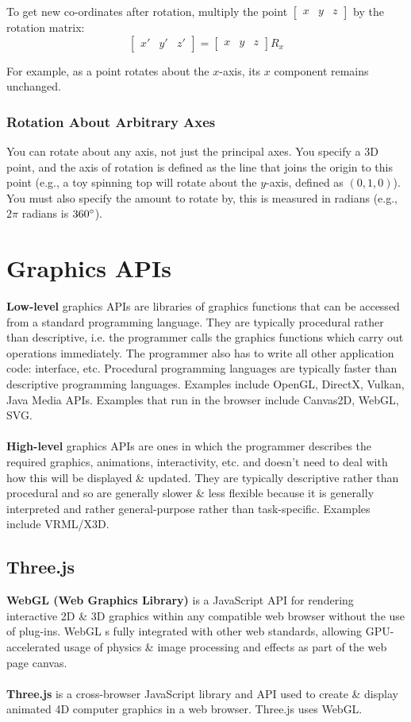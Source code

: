 \documentclass[a4paper,11pt]{article}
\begin{document}
To get new co-ordinates after rotation, multiply the point $\begin{bmatrix} x & y & z \end{bmatrix}$ by the
rotation matrix:
$$
\begin{bmatrix}
    x' & y' & z'
\end{bmatrix}
=
\begin{bmatrix}
    x & y & z
\end{bmatrix}
R_x
$$

For example, as a point rotates about the $x$-axis, its $x$ component remains unchanged.

\subsubsection{Rotation About Arbitrary Axes}
You can rotate about any axis, not just the principal axes.
You specify a 3D point, and the axis of rotation is defined as the line that joins the origin to this point
(e.g., a toy spinning top will rotate about the $y$-axis, defined as $(0, 1, 0)$).
You must also specify the amount to rotate by, this is measured in radians (e.g., $2\pi$ radians is $360\degree$).

\section{Graphics APIs}
\textbf{Low-level} graphics APIs are libraries of graphics functions that can be accessed from a standard 
programming language.
They are typically procedural rather than descriptive, i.e. the programmer calls the graphics functions which 
carry out operations immediately.
The programmer also has to write all other application code: interface, etc.
Procedural programming languages are typically faster than descriptive programming languages.
Examples include OpenGL, DirectX, Vulkan, Java Media APIs.
Examples that run in the browser include Canvas2D, WebGL, SVG.
\\\\
\textbf{High-level} graphics APIs are ones in which the programmer describes the required graphics, animations,
interactivity, etc. and doesn't need to deal with how this will be displayed \& updated.
They are typically descriptive rather than procedural and so are generally slower \& less flexible because it is 
generally interpreted and rather general-purpose rather than task-specific.
Examples include VRML/X3D.

\subsection{Three.js}
\textbf{WebGL (Web Graphics Library)} is a JavaScript API for rendering interactive 2D \& 3D graphics within any
compatible web browser without the use of plug-ins.
WebGL s fully integrated with other web standards, allowing GPU-accelerated usage of physics \& image processing
and effects as part of the web page canvas.
\\\\
\textbf{Three.js} is a cross-browser JavaScript library and API used to create \& display animated 4D computer 
graphics in a web browser.
Three.js uses WebGL.
\end{document}
